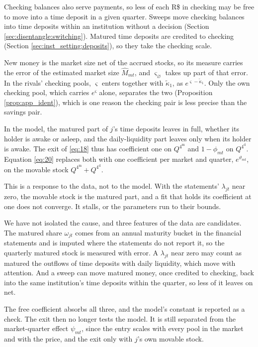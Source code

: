 Checking balances also serve payments, so less of each R\$ in checking may be free to move into a time deposit in a given quarter. Sweeps move checking balances into time deposits within an institution without a decision (Section \ref{sec:disentangle:switching}). Matured time deposits are credited to checking (Section \ref{sec:inst_setting:deposits}), so they take the checking scale.

New money is the market size net of the accrued stocks, so its measure carries the error of the estimated market size $\widehat{M}_{mt}$, and $\varsigma_{\varnothing}$ takes up part of that error. In the rivals' checking pools, $\varsigma$ enters together with $\tilde{\kappa}_1$, as $e^{\varsigma-\tilde{\kappa}_1}$. Only the own checking pool, which carries $e^{\varsigma}$ alone, separates the two (Proposition \ref{prop:app_ident}), which is one reason the checking pair is less precise than the savings pair.

In the model, the matured part of $j$'s time deposits leaves in full, whether its holder is awake or asleep, and the daily-liquidity part leaves only when its holder is awake. The exit of \eqref{eq:18} thus has coefficient one on $Q^{4^{\mathrm{m}}}$ and $1-\phi_{mt}$ on $Q^{4^{\mathrm{d}}}$. Equation \eqref{eq:20} replaces both with one coefficient per market and quarter, $e^{\vartheta_{mt}}$, on the movable stock $Q^{4^{\mathrm{m}}}+Q^{4^{\mathrm{d}}}$.

This is a response to the data, not to the model. With the statements' $\lambda_{jt}$ near zero, the movable stock is the matured part, and a fit that holds its coefficient at one does not converge. It stalls, or the parameters run to their bounds.

We have not isolated the cause, and three features of the data are candidates. The matured share $\omega_{jt}$ comes from an annual maturity bucket in the financial statements and is imputed where the statements do not report it, so the quarterly matured stock is measured with error. A $\lambda_{jt}$ near zero may count as matured the outflows of time deposits with daily liquidity, which move with attention. And a sweep can move matured money, once credited to checking, back into the same institution's time deposits within the quarter, so less of it leaves on net.

The free coefficient absorbs all three, and the model's constant is reported as a check. The exit then no longer tests the model. It is still separated from the market-quarter effect $\psi_{mt}$, since the entry scales with every pool in the market and with the price, and the exit only with $j$'s own movable stock.

